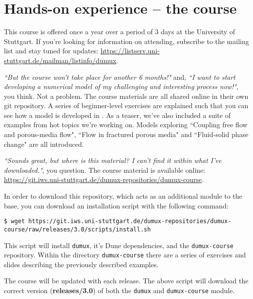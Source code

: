 \section{Hands-on \Dumux experience -- the \Dumux course}
This course is offered once a year over a period of 3 days at the University of Stuttgart.
If you're looking for information on attending, subscribe to the \Dumux mailing list
and stay tuned for updates:
\url{https://listserv.uni-stuttgart.de/mailman/listinfo/dumux}. \par
%
\textit{``But the course won't take place for another 6 months!"} and,
\textit{``I want to start developing a numerical model of my challenging and
  interesting process now!"}, you think.
Not a problem. The course materials are all shared online in their own
git repository. A series of beginner-level exercises are explained
such that you can see how a model is developed in \Dumux. As a teaser, we've
 also included a suite of examples from hot topics we're working on. Models
  exploring ``Coupling free flow and porous-media flow", ``Flow in fractured
   porous media" and ``Fluid-solid phase change" are all introduced.  \par
\textit{``Sounds great, but where is this material? I can't find it within
what I've downloaded."}, you question.
The \Dumux course material is available online:
\url{https://git.iws.uni-stuttgart.de/dumux-repositories/dumux-course}. \par
In order to download this repository, which acts as an additional module to
the \Dumux base, you can download an installation script with the following command:
\begin{lstlisting}[style=Bash]
$ wget https://git.iws.uni-stuttgart.de/dumux-repositories/dumux-course/raw/releases/3.0/scripts/install.sh
\end{lstlisting}
This script will install \texttt{dumux}, it's Dune dependencies, and the \texttt{dumux-course}
repository. Within the directory \texttt{dumux-course} there are a series of exercises
and slides describing the previously described examples. \par
%
The \Dumux course will be updated with each \Dumux release.
The above script will download the correct version (\textbf{releases/3.0}) of both
the \texttt{dumux} and \texttt{dumux-course} module.

